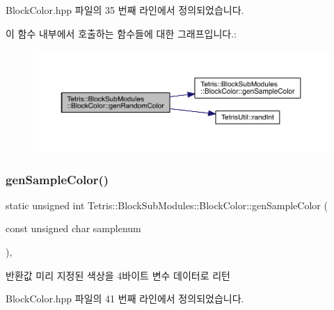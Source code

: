 Block\+Color.\+hpp 파일의 35 번째 라인에서 정의되었습니다.

이 함수 내부에서 호출하는 함수들에 대한 그래프입니다.\+:
\nopagebreak
\begin{figure}[H]
\begin{center}
\leavevmode
\includegraphics[width=350pt]{class_tetris_1_1_block_sub_modules_1_1_block_color_a74374a6d24cd77c7f4fe03e19111bab7_cgraph}
\end{center}
\end{figure}
\mbox{\label{class_tetris_1_1_block_sub_modules_1_1_block_color_a624fe688c2889c345cb8dff757f06ef9}} 
\subsubsection{\texorpdfstring{gen\+Sample\+Color()}{genSampleColor()}}
{\footnotesize\ttfamily static unsigned int Tetris\+::\+Block\+Sub\+Modules\+::\+Block\+Color\+::gen\+Sample\+Color (\begin{DoxyParamCaption}\item[{const unsigned char}]{samplenum }\end{DoxyParamCaption})\hspace{0.3cm}{\ttfamily [inline]}, {\ttfamily [static]}}

\begin{DoxyReturn}{반환값}
미리 지정된 색상을 4바이트 변수 데이터로 리턴 
\end{DoxyReturn}


Block\+Color.\+hpp 파일의 41 번째 라인에서 정의되었습니다.

